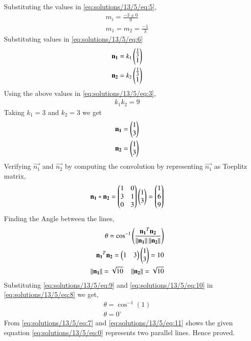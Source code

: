 Substituting the values in \eqref{eq:solutions/13/5/eq:5},
\begin{align}
m_i = \frac{-3\pm 0}{9}\\
m_1= m_2 = \frac{-1}{3} \label{eq:solutions/13/5/eq:7}
\end{align}
Substituting values in \eqref{eq:solutions/13/5/eq:6}
\begin{align}
\mathbf{n_1}=k_1\begin{pmatrix}\frac{1}{3}\\1\end{pmatrix}\\
\mathbf{n_2}=k_2\begin{pmatrix}\frac{1}{3}\\1\end{pmatrix}
\end{align}
Using the above values in \eqref{eq:solutions/13/5/eq:3},
\begin{align}
k_1k_2 = 9
\end{align}
Taking $k_1=3$ and $k_2 = 3$ we get
\begin{align}
\mathbf{n_1}=\begin{pmatrix}1\\3\end{pmatrix}\\
\mathbf{n_2}=\begin{pmatrix}1\\3\end{pmatrix}
\end{align}
Verifying $\vec{n_1}$ and $\vec{n_2}$ by computing the convolution by representing $\vec{n_1}$ as Toeplitz matrix,
\begin{align}
\mathbf{n_1}*\mathbf{n_2}=\begin{pmatrix}1&0\\3&1\\0&3\end{pmatrix}\begin{pmatrix}1\\3\end{pmatrix}=\begin{pmatrix}1\\6\\9\end{pmatrix}
\end{align}
Finding the Angle between the lines,
\begin{align}
\theta = \cos^{-1}\left(\frac{\mathbf{n_1}^T\mathbf{n_2}}{\left\lVert\mathbf{n_1}\right\rVert\left\lVert\mathbf{n_2}\right\rVert}\right)\label{eq:solutions/13/5/eq:8}\\
\mathbf{n_1}^T\mathbf{n_2} = \begin{pmatrix}1&3\end{pmatrix}\begin{pmatrix}1\\3\end{pmatrix} = 10 \label{eq:solutions/13/5/eq:9}\\
\left\lVert\mathbf{n_1}\right\rVert = \sqrt{10}\quad \left\lVert\mathbf{n_2}\right\rVert=\sqrt{10} \label{eq:solutions/13/5/eq:10}
\end{align}
Substituting \eqref{eq:solutions/13/5/eq:9} and \eqref{eq:solutions/13/5/eq:10} in \eqref{eq:solutions/13/5/eq:8} we get,
\begin{align}
\theta = \cos^{-1}(1)\\
\theta = 0^{\circ}\label{eq:solutions/13/5/eq:11}
\end{align}
From \eqref{eq:solutions/13/5/eq:7} and \eqref{eq:solutions/13/5/eq:11} shows the given equation \eqref{eq:solutions/13/5/eq:0} represents two parallel lines. Hence proved.
